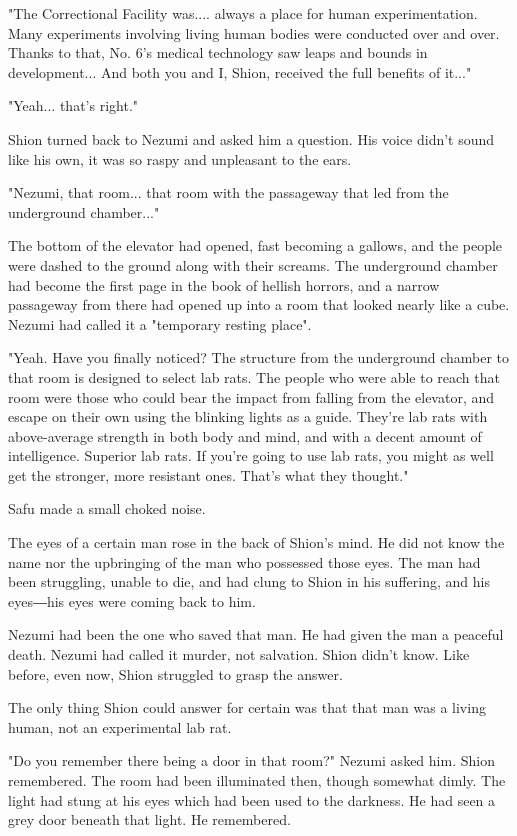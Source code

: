 "The Correctional Facility was.... always a place for human
experimentation. Many experiments involving living human bodies were
conducted over and over. Thanks to that, No. 6's medical technology saw
leaps and bounds in development... And both you and I, Shion, received
the full benefits of it..."

"Yeah... that's right."

Shion turned back to Nezumi and asked him a question. His voice didn't
sound like his own, it was so raspy and unpleasant to the ears.

"Nezumi, that room... that room with the passageway that led from the
underground chamber..."

The bottom of the elevator had opened, fast becoming a gallows, and the
people were dashed to the ground along with their screams. The
underground chamber had become the first page in the book of hellish
horrors, and a narrow passageway from there had opened up into a room
that looked nearly like a cube. Nezumi had called it a "temporary
resting place".

"Yeah. Have you finally noticed? The structure from the underground
chamber to that room is designed to select lab rats. The people who were
able to reach that room were those who could bear the impact from
falling from the elevator, and escape on their own using the blinking
lights as a guide. They're lab rats with above-average strength in both
body and mind, and with a decent amount of intelligence. Superior lab
rats. If you're going to use lab rats, you might as well get the
stronger, more resistant ones. That's what they thought."

Safu made a small choked noise.

The eyes of a certain man rose in the back of Shion's mind. He did not
know the name nor the upbringing of the man who possessed those eyes.
The man had been struggling, unable to die, and had clung to Shion in
his suffering, and his eyes―his eyes were coming back to him.

Nezumi had been the one who saved that man. He had given the man a
peaceful death. Nezumi had called it murder, not salvation. Shion didn't
know. Like before, even now, Shion struggled to grasp the answer.

The only thing Shion could answer for certain was that that man was a
living human, not an experimental lab rat.

"Do you remember there being a door in that room?" Nezumi asked him.
Shion remembered. The room had been illuminated then, though somewhat
dimly. The light had stung at his eyes which had been used to the
darkness. He had seen a grey door beneath that light. He remembered.

